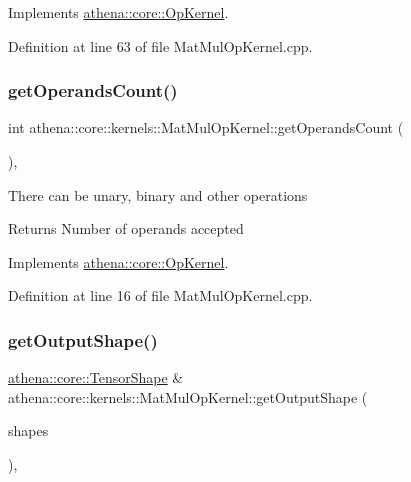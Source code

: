 Implements \mbox{\hyperlink{classathena_1_1core_1_1_op_kernel_ad95af6dd184ce7ee9182ec7ca54b6c4d}{athena\+::core\+::\+Op\+Kernel}}.



Definition at line 63 of file Mat\+Mul\+Op\+Kernel.\+cpp.

\mbox{\label{classathena_1_1core_1_1kernels_1_1_mat_mul_op_kernel_a75f9e43d1fcecaf9260af31c68cd69db}} 
\subsubsection{\texorpdfstring{get\+Operands\+Count()}{getOperandsCount()}}
{\footnotesize\ttfamily int athena\+::core\+::kernels\+::\+Mat\+Mul\+Op\+Kernel\+::get\+Operands\+Count (\begin{DoxyParamCaption}{ }\end{DoxyParamCaption})\hspace{0.3cm}{\ttfamily [override]}, {\ttfamily [virtual]}}

There can be unary, binary and other operations \begin{DoxyReturn}{Returns}
Number of operands accepted 
\end{DoxyReturn}


Implements \mbox{\hyperlink{classathena_1_1core_1_1_op_kernel_add97d4c132d80ecd9915acfedf7c9119}{athena\+::core\+::\+Op\+Kernel}}.



Definition at line 16 of file Mat\+Mul\+Op\+Kernel.\+cpp.

\mbox{\label{classathena_1_1core_1_1kernels_1_1_mat_mul_op_kernel_a3a397257c208f55ba5fba4018112a605}} 
\subsubsection{\texorpdfstring{get\+Output\+Shape()}{getOutputShape()}}
{\footnotesize\ttfamily \mbox{\hyperlink{classathena_1_1core_1_1_tensor_shape}{athena\+::core\+::\+Tensor\+Shape}} \& athena\+::core\+::kernels\+::\+Mat\+Mul\+Op\+Kernel\+::get\+Output\+Shape (\begin{DoxyParamCaption}\item[{std\+::vector$<$ \mbox{\hyperlink{classathena_1_1core_1_1_tensor_shape}{athena\+::core\+::\+Tensor\+Shape}} $>$ \&}]{shapes }\end{DoxyParamCaption})\hspace{0.3cm}{\ttfamily [override]}, {\ttfamily [virtual]}}

